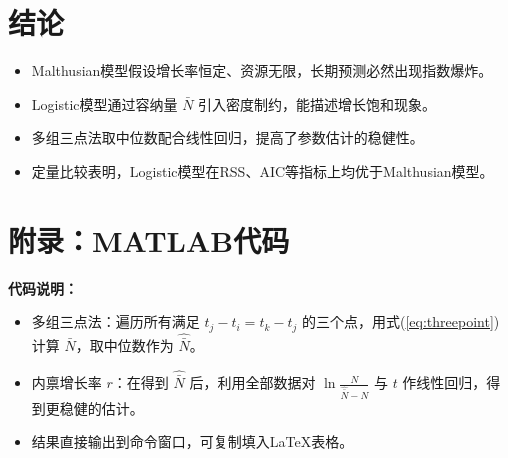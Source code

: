 \section{结论}
\begin{itemize}
    \item Malthusian模型假设增长率恒定、资源无限，长期预测必然出现指数爆炸。
    \item Logistic模型通过容纳量 $\bar{N}$ 引入密度制约，能描述增长饱和现象。
    \item 多组三点法取中位数配合线性回归，提高了参数估计的稳健性。
    \item 定量比较表明，Logistic模型在RSS、AIC等指标上均优于Malthusian模型。
\end{itemize}

\section*{附录：MATLAB代码}
\textbf{代码说明：}
\begin{itemize}
    \item 多组三点法：遍历所有满足 $t_j-t_i = t_k-t_j$ 的三个点，用式(\ref{eq:threepoint})计算 $\bar{N}$，取中位数作为 $\hat{\bar{N}}$。
    \item 内禀增长率 $r$：在得到 $\hat{\bar{N}}$ 后，利用全部数据对 $\ln\frac{N}{\hat{\bar{N}}-N}$ 与 $t$ 作线性回归，得到更稳健的估计。
    \item 结果直接输出到命令窗口，可复制填入LaTeX表格。
\end{itemize}
